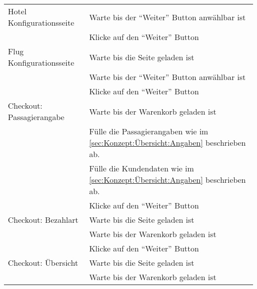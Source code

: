 \begin{table}[H]
\begin{tabularx}{0.9\textwidth}{ | l | X | }
		\multirow{1}{*}{Hotel Konfigurationsseite} & Warte bis der "`Weiter"' Button anwählbar ist \\ \cline{2-2}
		& Klicke auf den "`Weiter"' Button \\ \hline
				
		\multirow{1}{*}{Flug Konfigurationsseite} & Warte bis die Seite geladen ist \\ \cline{2-2}
		& Warte bis der "`Weiter"' Button anwählbar ist \\ \cline{2-2}
		& Klicke auf den "`Weiter"' Button \\ \hline
		
		\multirow{1}{*}{Checkout: Passagierangabe} & Warte bis der Warenkorb geladen ist \\ \cline{2-2}
		& Fülle die Passagierangaben wie im \cref{sec:Konzept:Übersicht:Angaben} \nameref{sec:Konzept:Übersicht:Angaben} beschrieben ab. \\ \cline{2-2}
		& Fülle die Kundendaten wie im \cref{sec:Konzept:Übersicht:Angaben} \nameref{sec:Konzept:Übersicht:Angaben} beschrieben ab. \\ \cline{2-2}
		& Klicke auf den "`Weiter"' Button \\ \hline
		
		\multirow{1}{*}{Checkout: Bezahlart} & Warte bis die Seite geladen ist \\ \cline{2-2}
		& Warte bis der Warenkorb geladen ist \\ \cline{2-2}
		& Klicke auf den "`Weiter"' Button \\ \hline
		
		\multirow{1}{*}{Checkout: Übersicht} & Warte bis die Seite geladen ist \\ \cline{2-2}
		& Warte bis der Warenkorb geladen ist \\ \hline
	\end{tabularx} 
\end{table}

